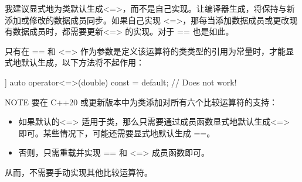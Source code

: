 我建议显式地为类默认生成<=>，而不是自己实现。让编译器生成，将保持与新添加或修改的数据成员同步。如果自己实现 <=>，那每当添加数据成员或更改现有数据成员时，都需要更新<=> 的实现。对于 == 也是如此。

只有在 == 和 <=> 作为参数是定义该运算符的类类型的引用为常量时，才能显式地默认生成，以下方法将不起作用：

\begin{cpp}
[[nodiscard]] auto operator<=>(double) const = default; // Does not work!
\end{cpp}

\begin{myNotic}{NOTE}
要在 C++20 或更新版本中为类添加对所有六个比较运算符的支持：

\begin{itemize}
\item
如果默认的<=> 适用于类，那么只需要通过成员函数显式地默认生成<=> 即可。某些情况下，可能还需要显式地默认生成 ==。

\item
否则，只需重载并实现 == 和 <=> 成员函数即可。
\end{itemize}

从而，不需要手动实现其他比较运算符。
\end{myNotic}
